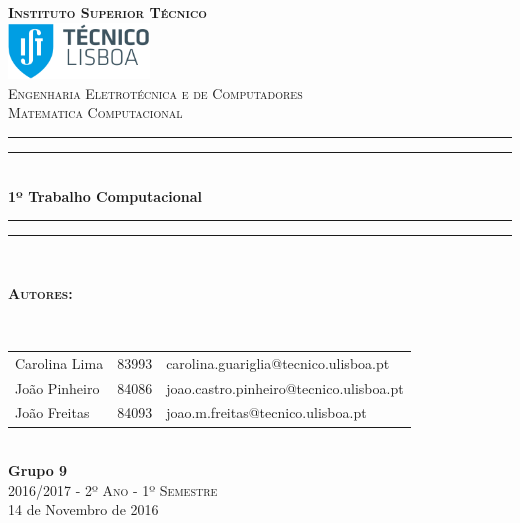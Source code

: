 \documentclass[12pt]{article}
\begin{document}
\begin{titlepage}

\thispagestyle{empty}
\newcommand{\HRule}{\rule{\linewidth}{0.5mm}} %
\center
\textsc{\bfseries\LARGE Instituto Superior Técnico}\\[1cm] %
\includegraphics[height=1.5cm]{IST_Logo.pdf}\\[2.5cm]
\textsc{\Large Engenharia Eletrotécnica e de Computadores}\\[0.5cm] %
\textsc{\large Matematica Computacional }\\[0.5cm] %

\rule{\textwidth}{1.6pt}\vspace*{-\baselineskip}\vspace*{2pt} %
\rule{\textwidth}{0.4pt}\\[\baselineskip] %

{\Huge \bfseries 1º Trabalho Computacional}\\[0.2cm]

\rule{\textwidth}{0.4pt}\vspace*{-\baselineskip}\vspace{3.2pt} %
\rule{\textwidth}{1.6pt}\\[1.5cm]


\begin{minipage}{0.9\textwidth}
	\begin{flushleft} \large
		\begin{Large}\bfseries\textsc{Autores:}\end{Large}\\[0.4cm]
		\begin{tabular}{l l l}

			Carolina Lima & 83993 & \normalsize carolina.guariglia@tecnico.ulisboa.pt \\
			João Pinheiro & 84086 & \normalsize joao.castro.pinheiro@tecnico.ulisboa.pt \\
			João Freitas & 84093 & \normalsize joao.m.freitas@tecnico.ulisboa.pt \\

		\end{tabular}
	\end{flushleft}
\end{minipage}\\[0.5cm]


{\bfseries Grupo 9}\\[2cm]
\large\textsc{ 2016/2017 - 2º Ano - 1º Semestre}\\
\large 14 de Novembro de 2016\\[1cm]


\end{titlepage}
\end{document}

